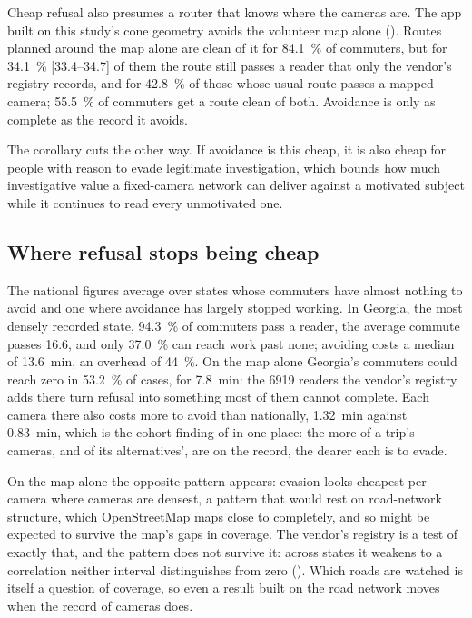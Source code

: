 \documentclass[11pt,twoside]{article}
\begin{document}
Cheap refusal also presumes a router that knows where the cameras are. The app built on this
study's cone geometry avoids the volunteer map alone (). Routes planned around
the map alone are clean of it for \SI{84.1}{\percent} of commuters, but for \SI{34.1}{\percent}
[33.4--34.7] of them the route still passes a reader that only the vendor's registry records,
and for \SI{42.8}{\percent} of those whose usual route passes a mapped camera; \SI{55.5}{\percent}
of commuters get a route clean of both. Avoidance is only as complete as the record it avoids.

The corollary cuts the other way. If avoidance is this cheap, it is also cheap for people
with reason to evade legitimate investigation, which bounds how much investigative value a
fixed-camera network can deliver against a motivated subject while it continues to read
every unmotivated one.

\subsection{Where refusal stops being cheap}

The national figures average over states whose commuters have almost nothing to avoid and one
where avoidance has largely stopped working. In Georgia, the most densely recorded state,
\SI{94.3}{\percent} of commuters pass a reader, the average commute passes \num{16.6}, and only
\SI{37.0}{\percent} can reach work past none; avoiding costs a median of \SI{13.6}{\minute}, an
overhead of \SI{44}{\percent}. On the map alone Georgia's commuters could reach zero in
\SI{53.2}{\percent} of cases, for \SI{7.8}{\minute}: the \num{6919} readers the vendor's
registry adds there turn refusal into something most of them cannot complete. Each camera
there also costs more to avoid than nationally, \SI{1.32}{\minute} against \SI{0.83}{\minute},
which is the cohort finding of  in one place: the more of a trip's
cameras, and of its alternatives', are on the record, the dearer each is to evade.

On the map alone the opposite pattern appears: evasion looks cheapest per camera where cameras
are densest, a pattern that would rest on road-network structure, which OpenStreetMap maps
close to completely, and so might be expected to survive the map's gaps in coverage. The
vendor's registry is a test of exactly that, and the pattern does not survive it: across
states it weakens to a correlation neither interval distinguishes from zero
(). Which roads are watched is itself a question of coverage, so even a
result built on the road network moves when the record of cameras does.
\end{document}
